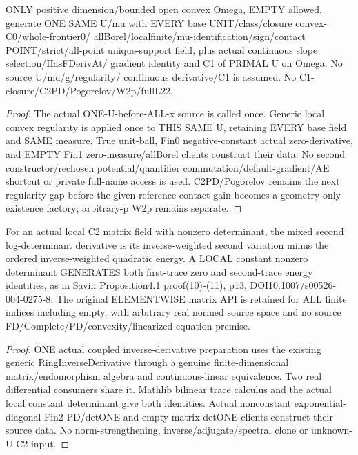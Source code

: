 \begin{lemma}
  \label{lem:unit-primal-c1}
  \leanok
  ONLY positive dimension/bounded open convex Omega, EMPTY allowed, generate
  ONE SAME U/mu with EVERY base UNIT/class/closure convex-C0/whole-frontier0/
  allBorel/localfinite/mu-identification/sign/contact POINT/strict/all-point
  unique-support field, plus actual continuous slope selection/HasFDerivAt/
  gradient identity and C1 of PRIMAL U on Omega. No source U/mu/g/regularity/
  continuous derivative/C1 is assumed. No C1-closure/C2PD/Pogorelov/W2p/fullL22.
\end{lemma}
\begin{proof}
  \leanok
  The actual ONE-U-before-ALL-x source is called once. Generic local convex
  regularity is applied once to THIS SAME U, retaining EVERY base field and
  SAME measure. True unit-ball, Fin0 negative-constant actual zero-derivative,
  and EMPTY Fin1 zero-measure/allBorel clients construct their data. No second
  constructor/rechosen potential/quantifier commutation/default-gradient/AE
  shortcut or private full-name access is used. C2PD/Pogorelov remains the
  next regularity gap before the given-reference contact gain becomes a
  geometry-only existence factory; arbitrary-p W2p remains separate.
\end{proof}


\begin{lemma}
  \label{lem:matrix-logdet-second}
  \leanok
  For an actual local C2 matrix field with nonzero determinant, the mixed
  second log-determinant derivative is its inverse-weighted second variation
  minus the ordered inverse-weighted quadratic energy. A LOCAL constant
  nonzero determinant GENERATES both first-trace zero and second-trace energy
  identities, as in Savin Proposition4.1 proof(10)-(11), p13,
  DOI10.1007/s00526-004-0275-8. The original ELEMENTWISE matrix API is retained
  for ALL finite indices including empty, with arbitrary real normed source
  space and no source FD/Complete/PD/convexity/linearized-equation premise.
\end{lemma}
\begin{proof}
  \leanok
  ONE actual coupled inverse-derivative preparation uses the existing generic
  RingInverseDerivative through a genuine finite-dimensional matrix/endomorphism
  algebra and continuous-linear equivalence. Two real differential consumers
  share it. Mathlib bilinear trace calculus and the actual local constant
  determinant give both identities. Actual nonconstant exponential-diagonal
  Fin2 PD/detONE and empty-matrix detONE clients construct their source data.
  No norm-strengthening, inverse/adjugate/spectral clone or unknown-U C2 input.
\end{proof}

